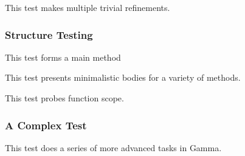 

This test makes multiple trivial refinements.

\subsubsection{Structure Testing}



This test forms a main method



This test presents minimalistic bodies for a variety of methods.



This test probes function scope.

\subsubsection{A Complex Test}

This test does a series of more advanced tasks in Gamma.